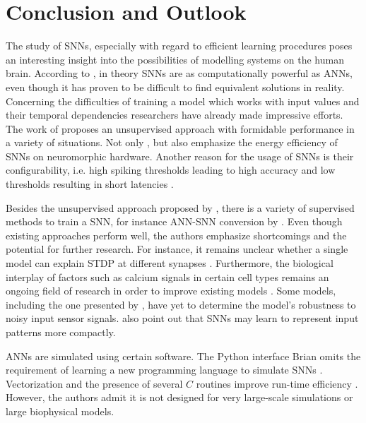 \section{Conclusion and Outlook}
\label{sec:conclusion}

The study of \acp{SNN}, especially with regard to efficient learning procedures poses an interesting insight into the possibilities of modelling
systems on the human brain.
According to \authorsANNSNNconversion{} \cite{ANN_SNN_conversion}, in theory \acp{SNN} are as computationally powerful as \acp{ANN}, 
even though it has proven to be difficult to find equivalent solutions in reality.
Concerning the difficulties of training a model which works with input values and their temporal dependencies researchers have already made 
impressive efforts.
The work of \authorsSNN{} \cite{SNN} proposes an unsupervised approach with formidable performance in a variety of situations.
Not only \authorsSNN{} \cite{SNN}, but also \authorsSynapticPlasticity{} \cite{Synaptic_plasticity} emphasize the energy efficiency of 
\acp{SNN} on neuromorphic hardware.
Another reason for the usage of \acp{SNN} is their configurability, 
i.e. high spiking thresholds leading to high accuracy and low thresholds resulting in short latencies \cite{ANN_SNN_conversion}.

Besides the unsupervised approach proposed by \authorsSNN{} \cite{SNN}, there is a variety of supervised methods to train a \ac{SNN}, 
for instance \ac{ANN}-\ac{SNN} conversion by \authorsDIETSNN{} \cite{DIET_SNN}.
Even though existing approaches perform well, the authors emphasize shortcomings and the potential for further research.
For instance, it remains unclear whether a single model can explain \ac{STDP} at different synapses \cite{STDP_hebbian}.
Furthermore, the biological interplay of factors such as calcium signals in certain cell types remains an ongoing field of research 
in order to improve existing models \cite{STDP_hebbian}.
Some models, including the one presented by \authorsObjectDetectionSNN{} \cite{object_detection_SNN}, have yet to determine the model's robustness to noisy input sensor signals.
\authorsObjectDetectionSNN{} \cite{object_detection_SNN} also point out that \acp{SNN} may learn to represent input patterns more compactly.

\Acp{ANN} are simulated using certain software.
The Python interface Brian omits the requirement of learning a new programming language to simulate \acp{SNN} \cite{simulation_Brian}.
Vectorization and the presence of several $C$ routines improve run-time efficiency \cite{simulation_Brian}.
However, the authors admit it is not designed for very large-scale simulations or large biophysical models.

